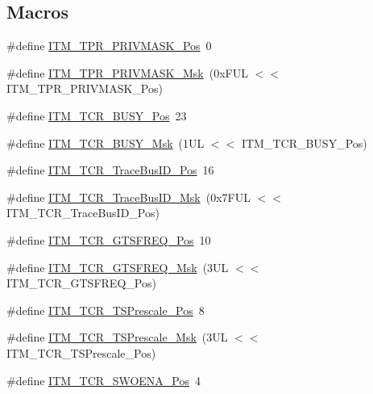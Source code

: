 \subsection*{Macros}
\begin{DoxyCompactItemize}
\item 
\#define \hyperlink{group___c_m_s_i_s___i_t_m_ga7abe5e590d1611599df87a1884a352e8}{I\-T\-M\-\_\-\-T\-P\-R\-\_\-\-P\-R\-I\-V\-M\-A\-S\-K\-\_\-\-Pos}~0
\item 
\#define \hyperlink{group___c_m_s_i_s___i_t_m_ga168e089d882df325a387aab3a802a46b}{I\-T\-M\-\_\-\-T\-P\-R\-\_\-\-P\-R\-I\-V\-M\-A\-S\-K\-\_\-\-Msk}~(0x\-F\-U\-L $<$$<$ I\-T\-M\-\_\-\-T\-P\-R\-\_\-\-P\-R\-I\-V\-M\-A\-S\-K\-\_\-\-Pos)
\item 
\#define \hyperlink{group___c_m_s_i_s___i_t_m_ga9174ad4a36052c377cef4e6aba2ed484}{I\-T\-M\-\_\-\-T\-C\-R\-\_\-\-B\-U\-S\-Y\-\_\-\-Pos}~23
\item 
\#define \hyperlink{group___c_m_s_i_s___i_t_m_ga43ad7cf33de12f2ef3a412d4f354c60f}{I\-T\-M\-\_\-\-T\-C\-R\-\_\-\-B\-U\-S\-Y\-\_\-\-Msk}~(1\-U\-L $<$$<$ I\-T\-M\-\_\-\-T\-C\-R\-\_\-\-B\-U\-S\-Y\-\_\-\-Pos)
\item 
\#define \hyperlink{group___c_m_s_i_s___i_t_m_gaca0281de867f33114aac0636f7ce65d3}{I\-T\-M\-\_\-\-T\-C\-R\-\_\-\-Trace\-Bus\-I\-D\-\_\-\-Pos}~16
\item 
\#define \hyperlink{group___c_m_s_i_s___i_t_m_ga60c20bd9649d1da5a2be8e656ba19a60}{I\-T\-M\-\_\-\-T\-C\-R\-\_\-\-Trace\-Bus\-I\-D\-\_\-\-Msk}~(0x7\-F\-U\-L $<$$<$ I\-T\-M\-\_\-\-T\-C\-R\-\_\-\-Trace\-Bus\-I\-D\-\_\-\-Pos)
\item 
\#define \hyperlink{group___c_m_s_i_s___i_t_m_ga96c7c7cbc0d98426c408090b41f583f1}{I\-T\-M\-\_\-\-T\-C\-R\-\_\-\-G\-T\-S\-F\-R\-E\-Q\-\_\-\-Pos}~10
\item 
\#define \hyperlink{group___c_m_s_i_s___i_t_m_gade862cf009827f7f6748fc44c541b067}{I\-T\-M\-\_\-\-T\-C\-R\-\_\-\-G\-T\-S\-F\-R\-E\-Q\-\_\-\-Msk}~(3\-U\-L $<$$<$ I\-T\-M\-\_\-\-T\-C\-R\-\_\-\-G\-T\-S\-F\-R\-E\-Q\-\_\-\-Pos)
\item 
\#define \hyperlink{group___c_m_s_i_s___i_t_m_gad7bc9ee1732032c6e0de035f0978e473}{I\-T\-M\-\_\-\-T\-C\-R\-\_\-\-T\-S\-Prescale\-\_\-\-Pos}~8
\item 
\#define \hyperlink{group___c_m_s_i_s___i_t_m_ga7a723f71bfb0204c264d8dbe8cc7ae52}{I\-T\-M\-\_\-\-T\-C\-R\-\_\-\-T\-S\-Prescale\-\_\-\-Msk}~(3\-U\-L $<$$<$ I\-T\-M\-\_\-\-T\-C\-R\-\_\-\-T\-S\-Prescale\-\_\-\-Pos)
\item 
\#define \hyperlink{group___c_m_s_i_s___i_t_m_ga7a380f0c8078f6560051406583ecd6a5}{I\-T\-M\-\_\-\-T\-C\-R\-\_\-\-S\-W\-O\-E\-N\-A\-\_\-\-Pos}~4
$$
\end{DoxyCompactItemize}

